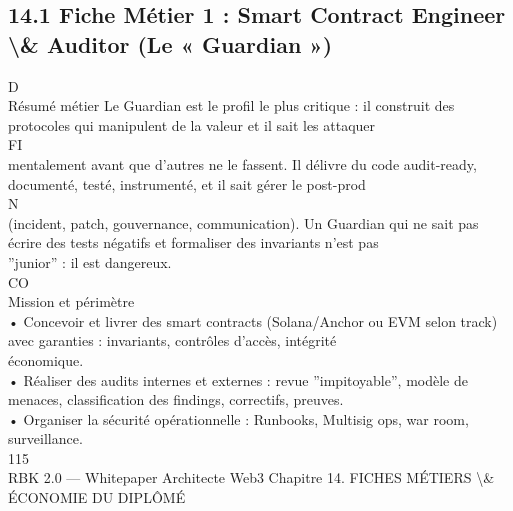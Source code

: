 \subsection{14.1 Fiche Métier 1 : Smart Contract Engineer \textbackslash{}& Auditor (Le « Guardian »)}
\vspace{0.5em}
\vspace{0.5em}
\vspace{0.5em}
\vspace{0.5em}
D\\
Résumé métier Le Guardian est le profil le plus critique : il construit des protocoles qui manipulent de la valeur et il sait les attaquer\\
\vspace{0.5em}
\vspace{0.5em}
\vspace{0.5em}
\vspace{0.5em}
FI\\
mentalement avant que d’autres ne le fassent. Il délivre du code audit-ready, documenté, testé, instrumenté, et il sait gérer le post-prod\\
\vspace{0.5em}
N\\
(incident, patch, gouvernance, communication). Un Guardian qui ne sait pas écrire des tests négatifs et formaliser des invariants n’est pas\\
”junior” : il est dangereux.\\
CO\\
Mission et périmètre\\
\vspace{0.5em}
• Concevoir et livrer des smart contracts (Solana/Anchor ou EVM selon track) avec garanties : invariants, contrôles d’accès, intégrité\\
économique.\\
\vspace{0.5em}
• Réaliser des audits internes et externes : revue ”impitoyable”, modèle de menaces, classification des findings, correctifs, preuves.\\
\vspace{0.5em}
• Organiser la sécurité opérationnelle : Runbooks, Multisig ops, war room, surveillance.\\
\vspace{0.5em}
\vspace{0.5em}
\vspace{0.5em}
\vspace{0.5em}
115\\
RBK 2.0 — Whitepaper Architecte Web3                                                               Chapitre 14. FICHES MÉTIERS \textbackslash{}& ÉCONOMIE DU DIPLÔMÉ\\
